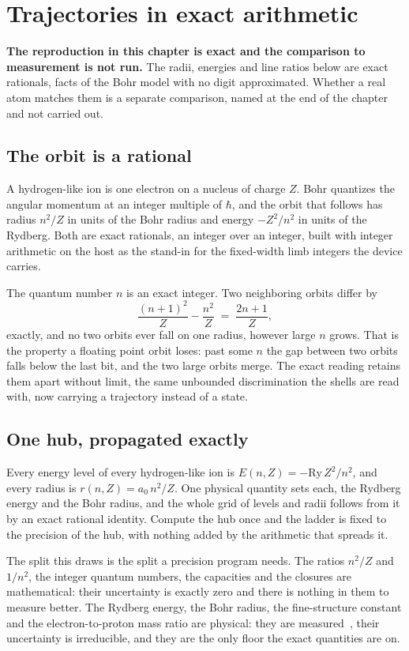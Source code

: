 \chapter{Trajectories in exact arithmetic}

\textbf{The reproduction in this chapter is exact and the comparison to measurement is not run.} The
radii, energies and line ratios below are exact rationals, facts of the Bohr model with no digit
approximated. Whether a real atom matches them is a separate comparison, named at the end of the
chapter and not carried out.

\section{The orbit is a rational}

A hydrogen-like ion is one electron on a nucleus of charge $Z$. Bohr quantizes the angular momentum
at an integer multiple of $\hbar$, and the orbit that follows has radius $n^2/Z$ in units of the Bohr
radius and energy $-Z^2/n^2$ in units of the Rydberg. Both are exact rationals, an integer over an
integer, built with integer arithmetic on the host as the stand-in for the fixed-width limb integers
the device carries.

The quantum number $n$ is an exact integer. Two neighboring orbits differ by
\[
\frac{(n+1)^2}{Z} - \frac{n^2}{Z} \;=\; \frac{2n+1}{Z},
\]
exactly, and no two orbits ever fall on one radius, however large $n$ grows. That is the property a
floating point orbit loses: past some $n$ the gap between two orbits falls below the last bit, and the
two large orbits merge. The exact reading retains them apart without limit, the same unbounded
discrimination the shells are read with, now carrying a trajectory instead of a state.

\section{One hub, propagated exactly}

Every energy level of every hydrogen-like ion is $E(n, Z) = -\mathrm{Ry}\, Z^2/n^2$, and every radius
is $r(n, Z) = a_0\, n^2/Z$. One physical quantity sets each, the Rydberg energy and the Bohr radius,
and the whole grid of levels and radii follows from it by an exact rational identity. Compute the hub
once and the ladder is fixed to the precision of the hub, with nothing added by the arithmetic that
spreads it.

The split this draws is the split a precision program needs. The ratios $n^2/Z$ and $1/n^2$, the
integer quantum numbers, the capacities and the closures are mathematical: their uncertainty is
exactly zero and there is nothing in them to measure better. The Rydberg energy, the Bohr radius, the
fine-structure constant and the electron-to-proton mass ratio are physical: they are
measured~\cite{src:Mohr-et-al-2025}, their uncertainty is irreducible, and they are the only floor the
exact quantities are on.

